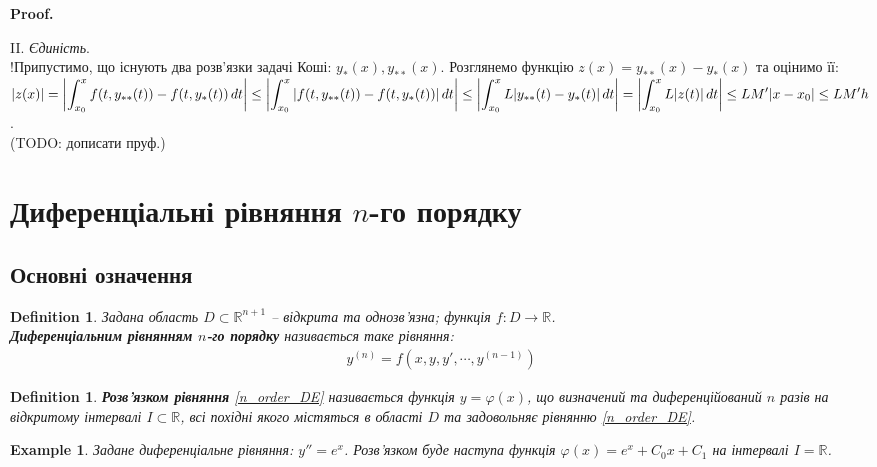 \documentclass[a4paper, 10pt]{article}
\makeatletter
\def\qed{$\blacksquare$}
\theoremstyle{theoremdd}
\theoremstyle{theoremdd}
\newtheorem{definition}[theorem]{Definition}
\theoremstyle{theoremdd}
\theoremstyle{theoremdd}
\newtheorem{example}[theorem]{Example}
\theoremstyle{theoremdd}
\theoremstyle{theoremdd}
\theoremstyle{theoremdd}
\theoremstyle{theoremdd}
\renewenvironment{proof}[1][Proof.\\]{\par
\pushQED{\hfill \qed}%
\normalfont \topsep6\p@\@plus6\p@\relax
\trivlist
\item\relax
{\bfseries
#1\@addpunct{.}}\hspace\labelsep\ignorespaces
}{%
\popQED\endtrivlist\@endpefalse
}
\makeatother
\begin{document}
\begin{proof}
	II. \textit{Єдиність}.\\
	!Припустимо, що існують два розв'язки задачі Коші: $y_*(x), y_{**}(x)$. Розглянемо функцію $z(x) = y_{**}(x) - y_{*}(x)$ та оцінимо її:\\
	$\displaystyle |z(x)| = \abs{\int_{x_0}^x f(t,y_{**}(t))-f(t,y_{*}(t))\,dt} \leq \abs{\int_{x_0}^x \abs{f(t,y_{**}(t))-f(t,y_{*}(t))} \,dt} \leq \abs{\int_{x_0}^x L\abs{y_{**}(t) - y_{*}(t)} \,dt} = \abs{\int_{x_0}^x L\abs{z(t)} \,dt} \leq LM'|x-x_0| \leq LM'h$.\\
	(TODO: дописати пруф.) 
\end{proof}
	\newpage
	
	
	\section{Диференціальні рівняння $n$-го порядку}
	\subsection{Основні означення}
	\begin{definition}
 Задана область $D \subset \mathbb{R}^{n+1}$ -- відкрита та однозв'язна; функція $f\colon D \to \mathbb{R}$.\\
	\textbf{Диференціальним рівнянням $n$-го порядку} називається таке рівняння:
	\begin{align}
	\label{n_order_DE}
	\
	y^{(n)} = f(x,y,y',\cdots,y^{(n-1)})
	\end{align}
	\end{definition}

	\begin{definition}
 \textbf{Розв'язком рівняння} \eqref{n_order_DE} називається функція $y= \varphi(x)$, що визначений та диференційований $n$ разів на відкритому інтервалі $I \subset \mathbb{R}$, всі похідні якого містяться в області $D$ та задовольняє рівнянню \eqref{n_order_DE}.
 	\end{definition}
 	
	\begin{example}
 Задане диференціальне рівняння: $y'' = e^x$. Розв'язком буде наступа функція $\varphi(x) = e^x + C_0x + C_1$ на інтервалі $I = \mathbb{R}$.
	\end{example}
	
\end{document}
